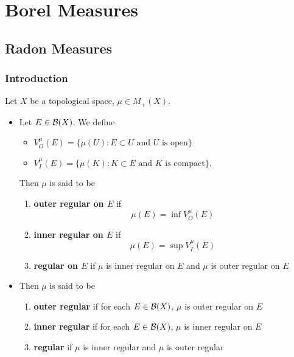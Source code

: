 \documentclass{book}
\begin{document}
	
	
	
	
	
	
	
	

	
	
	
	\newpage
	\chapter{Borel Measures}
	
	\section{Radon Measures}
	
	\subsection{Introduction}
	
	\begin{defn}  
	Let $X$ be a topological space, $\mu \in M_+(X)$.
	\begin{itemize}
		\item Let $E \in \mathcal{B}(X)$. We define 
		\begin{itemize}
			\item $V^{\mu}_O(E) =  \{ \mu(U): E \subset U \text{ and $U$ is open}\}$
			\item $V^{\mu}_I(E) = \{ \mu(K): K \subset E \text{ and $K$ is compact}\}$.
		\end{itemize}
		Then $\mu$ is said to be 
		\begin{enumerate}
			\item \textbf{outer regular on $E$} if
			$$\mu(E) = \inf V^{\mu}_O(E) $$
			\item \textbf{inner regular on $E$} if
			$$\mu(E) = \sup V^{\mu}_I(E) $$
			\item \textbf{regular on $E$} if $\mu$ is inner regular on $E$ and $\mu$ is outer regular on $E$
		\end{enumerate}
		\item Then $\mu$ is said to be 
		\begin{enumerate}
			\item  \textbf{outer regular} if for each $E \in \mathcal{B}(X)$, $\mu$ is outer regular on $E$
			\item  \textbf{inner regular} if for each $E \in \mathcal{B}(X)$, $\mu$ is inner regular on $E$
			\item  \textbf{regular} if $\mu$ is inner regular and $\mu$ is outer regular
		\end{enumerate}
	\end{itemize}
	\end{defn}
\end{document}
